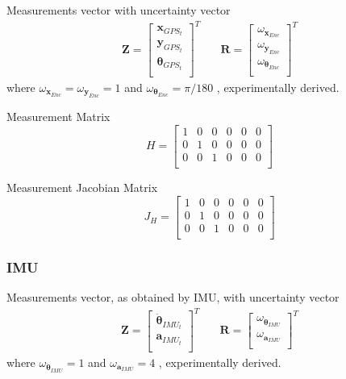 Measurements vector with uncertainty vector
\begin{align}
\mathbf{Z}
=
\begin{bmatrix} 
\mathbf{x}_{GPS_t} \\ 
\mathbf{y}_{GPS_t} \\ 
\boldsymbol \theta_{GPS_t} \\ 
\end{bmatrix}^T
& \quad
\mathbf{R}
=
\begin{bmatrix} 
\omega_{\mathbf{x}_{Enc}} \\ 
\omega_{\mathbf{y}_{Enc}} \\ 
\omega_{\boldsymbol \theta_{Enc}} \\ 
\end{bmatrix}^T
\end{align}
where $ \omega_{\mathbf{x}_{Enc}} = \omega_{\mathbf{y}_{Enc}} = 1$ and 
$ \omega_{\boldsymbol \theta_{Enc}} = \pi/180 $ , experimentally derived.


Measurement Matrix
\begin{equation}
H
=
\begin{bmatrix} 
1 & 0 & 0 & 0 & 0 & 0 \\ 
0 & 1 & 0 & 0 & 0 & 0 \\ 
0 & 0 & 1 & 0 & 0 & 0 \\ 
\end{bmatrix}
\end{equation}

Measurement Jacobian Matrix
\begin{equation}
J_H
=
\begin{bmatrix} 
1 & 0 & 0 & 0 & 0 & 0 \\ 
0 & 1 & 0 & 0 & 0 & 0 \\ 
0 & 0 & 1 & 0 & 0 & 0 \\ 
\end{bmatrix}
\end{equation}


\subsubsection{IMU}

Measurements vector, as obtained by IMU, with uncertainty vector
\begin{align}
\mathbf{Z}
=
\begin{bmatrix} 
\dot{\boldsymbol \theta }_{IMU_t} \\ 
\mathbf{a}_{IMU_t} \\ 
\end{bmatrix}^T
& \quad
\mathbf{R}
=
\begin{bmatrix} 
\omega_{\dot{\boldsymbol \theta}_{IMU}} \\ 
\omega_{\mathbf{a}_{IMU}} \\ 
\end{bmatrix}^T
\end{align}
where $ \omega_{\dot{\boldsymbol \theta}_{IMU}} = 1$ and 
$ \omega_{\mathbf{a}_{IMU}} = 4 $ , experimentally derived.


